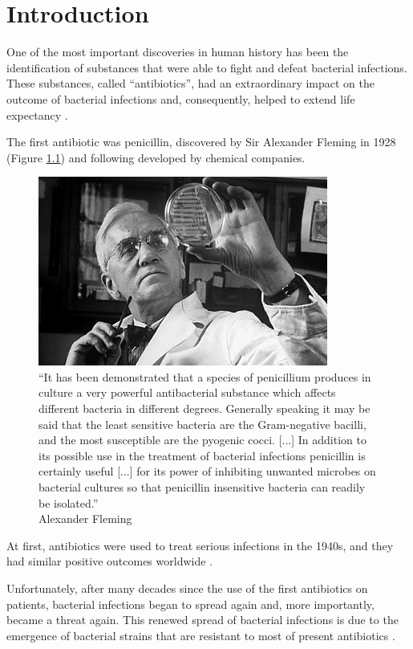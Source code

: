 \documentclass[11pt]{report}
\begin{document}
\tableofcontents

\chapter{Introduction}
One of the most important discoveries in human history has been the identification of substances that were able to fight and defeat bacterial infections.
These substances, called ``antibiotics'', had an extraordinary impact on the outcome of bacterial infections and, consequently, helped to extend life expectancy \cite{ventola2015antibiotic}.

The first antibiotic was penicillin, discovered by Sir Alexander Fleming in 1928 (Figure \ref{fleming}) and following developed by chemical companies.

\begin{figure}[htp]
\centering
\includegraphics[scale=1.10]{img/fleming.jpg}
\caption{``It has been demonstrated that a species of penicillium produces in culture a very powerful antibacterial substance which affects different bacteria in different degrees.
Generally speaking it may be said that the least sensitive bacteria are the Gram-negative bacilli, and the most susceptible are the pyogenic cocci. [...]
In addition to its possible use in the treatment of bacterial infections penicillin is certainly useful [...] for its power of inhibiting unwanted microbes on bacterial cultures so that penicillin insensitive bacteria can readily be isolated.''\\
Alexander Fleming}
\label{fleming}
\end{figure}

\clearpage
At first, antibiotics were used to treat serious infections in the 1940s, and they had similar positive outcomes worldwide \cite{Spellberg2014}.

Unfortunately, after many decades since the use of the first antibiotics on patients, bacterial infections began to spread again and, more importantly, became a threat again.
This renewed spread of bacterial infections is due to the emergence of bacterial strains that are resistant to most of present antibiotics \cite{ventola2015antibiotic}.
\end{document}
